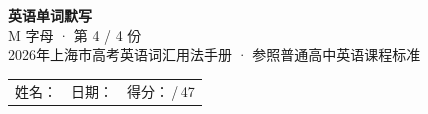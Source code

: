 \documentclass[10pt,a4paper]{article}
\begin{document}
\pagestyle{plain}

\begin{center}
{\LARGE\bfseries 英语单词默写}\\[0.22em]
{\large M 字母 · 第 4 / 4 份}\\[0.18em]
{\small 2026年上海市高考英语词汇用法手册 · 参照普通高中英语课程标准}
\end{center}

\vspace{0.25em}
\noindent\begin{tabular}{@{}p{}@{}p{}@{}p{}@{}}
姓名：\underline{\hspace{2.0cm}} & 日期：\underline{\hspace{2.0cm}} & 得分：\underline{\hspace{1.3cm}}\,/\,47 \\
\end{tabular}

\vspace{0.3em}

\vspace{0.08em}
\end{document}
